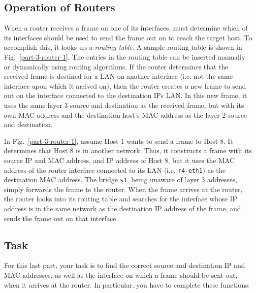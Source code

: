 \documentclass[11pt]{article}
\begin{document}
\subsection{Operation of Routers}
\label{subsec:logic-routers}
When a router receives a frame on one of its interfaces, must determine which of its interfaces should be used to send the frame out on to reach the target host.
To accomplish this, it looks up a \textit{routing table}. A sample routing table is shown in Fig.~\ref{part-3-router-1}.
The entries in the routing table can be inserted manually or dynamically using routing algorithms.
If the router determines that the received frame is destined for a LAN on another interface (i.e. not the same interface upon which it arrived on), then the router creates a new frame to send out on the interface connected to the destination IPs LAN.
In this new frame, it uses the same layer 3 source and destination as the received frame, but with its own MAC address and the destination host's MAC address as the layer 2 source and destination.



In Fig.~\ref{part-3-router-1}, assume Host 1 wants to send a frame to Host 8. It determines that Host 8 is in another network.
Thus, it constructs a frame with its source IP and MAC address, and IP address of Host 8, but it uses the MAC address of the router interface connected to its LAN (i.e. \texttt{r4-eth1}) as the destination MAC address. The bridge \texttt{s1}, being unaware of layer 3 addresses, simply forwards the frame to the router.
When the frame arrives at the router, the router looks into its routing table and searches for the interface whose IP address is in the same network as the destination IP address of the frame, and sends the frame out on that interface.

\subsection{Task}
\label{subsec:routing}
For this last part, your task is to find the correct source and destination IP and MAC addresses, as well as the interface on which a frame should be sent out, when it arrives at the router. In particular, you have to complete these functions:
\end{document}
